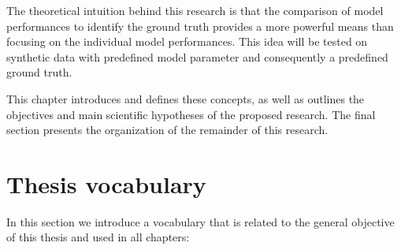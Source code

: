 The theoretical intuition behind this research is that the comparison of model performances to identify the ground truth provides a more powerful means than focusing on the individual model performances. This idea will be tested on synthetic data with predefined model parameter and consequently a predefined ground truth. 



This chapter introduces and defines these concepts, as well as outlines the objectives and main scientific hypotheses of the proposed research. The final section presents the organization of the remainder of this research.

\section{Thesis vocabulary}
\label{Vocabl}

In this section we introduce a vocabulary that is related to the general objective of this thesis and used in all chapters:

